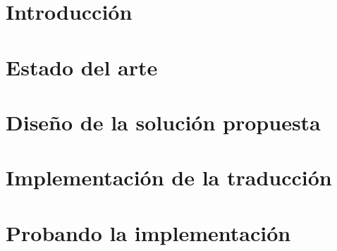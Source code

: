 \documentclass[12pt, oneside]{book}
\begin{document}




\chapter{Introducción}









\chapter{Estado del arte}







\chapter{Diseño de la solución propuesta}







\chapter{Implementación de la traducción}










\chapter{Probando la implementación}






\end{document}
